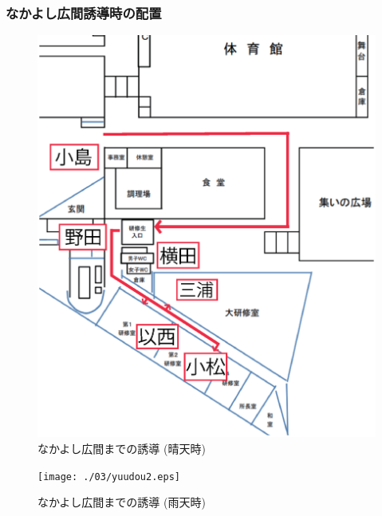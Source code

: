 \subsubsection{なかよし広間誘導時の配置}
\begin{figure}[htbp]
  \begin{center}
   \includegraphics[width=140mm]{./03/yuudou.eps}
  \end{center}
  \caption{なかよし広間までの誘導 (晴天時)}
  \label{fig:hare}
\end{figure}

\begin{figure}[htbp]
  \begin{center}
   \texttt{[image: ./03/yuudou2.eps]}
  \end{center}
  \caption{なかよし広間までの誘導 (雨天時)}
  \label{fig:ame}
\end{figure}


